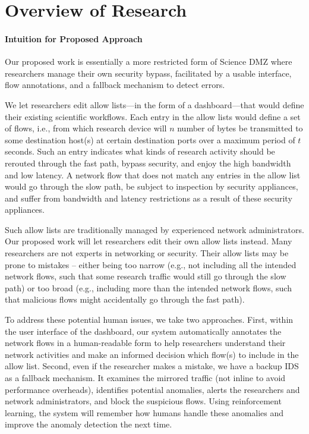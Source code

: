 \section{Overview of Research}

\paragraph{Intuition for Proposed Approach}
Our proposed work is essentially a more restricted form of Science DMZ where researchers manage their own security bypass, facilitated by a usable interface, flow annotations, and a fallback mechanism to detect errors.

We let researchers edit allow lists---in the form of a dashboard---that would define their existing scientific workflows. Each entry in the allow lists would define a set of flows, i.e., from which research device will $n$ number of bytes be transmitted to some destination host(s) at certain destination ports over a maximum period of $t$ seconds. Such an entry indicates what kinds of research activity should be rerouted through the fast path, bypass security, and enjoy the high bandwidth and low latency. A network flow that does not match any entries in the allow list would go through the slow path, be subject to inspection by security appliances, and suffer from bandwidth and latency restrictions as a result of these security appliances.

Such allow lists are traditionally managed by experienced network administrators. Our proposed work will let researchers edit their own allow lists instead. Many researchers are not experts in networking or security. Their allow lists may be prone to mistakes -- either being too narrow (e.g., not including all the intended network flows, such that some research traffic would still go through the slow path) or too broad (e.g., including more than the intended network flows, such that malicious flows might accidentally go through the fast path).

To address these potential human issues, we take two approaches. First, within the user interface of the dashboard, our system automatically annotates the network flows in a human-readable form to help researchers understand their network activities and make an informed decision which flow(s) to include in the allow list. Second, even if the researcher makes a mistake, we have a backup IDS as a fallback mechanism. It examines the mirrored traffic (not inline to avoid performance overheads), identifies potential anomalies, alerts the researchers and network administrators, and block the suspicious flows. Using reinforcement learning, the system will remember how humans handle these anomalies and improve the anomaly detection the next time.

